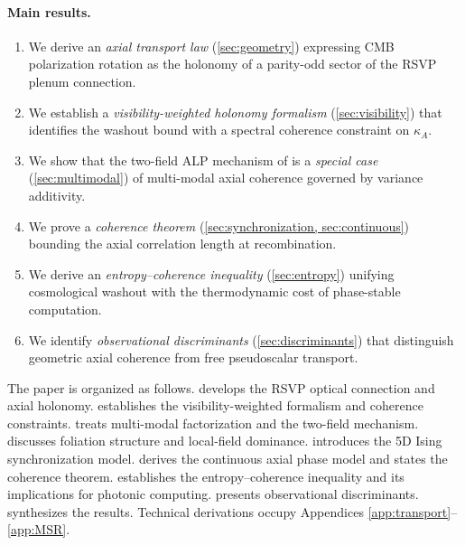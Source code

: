 \documentclass[12pt]{article}
\theoremstyle{definition}
\newcommand{\kA}{\kappa_A}
\begin{document}
\paragraph{Main results.}
\begin{enumerate}[leftmargin=1.8em,itemsep=2pt]
  \item We derive an \emph{axial transport law} (\cref{sec:geometry})
        expressing CMB polarization rotation as the holonomy of a
        parity-odd sector of the RSVP plenum connection.
  \item We establish a \emph{visibility-weighted holonomy formalism}
        (\cref{sec:visibility}) that identifies the washout bound with a
        spectral coherence constraint on $\kA$.
  \item We show that the two-field ALP mechanism of
        \cite{ShaoObataZhang2025} is a \emph{special case}
        (\cref{sec:multimodal}) of multi-modal axial coherence
        governed by variance additivity.
  \item We prove a \emph{coherence theorem} (\cref{sec:synchronization,
        sec:continuous}) bounding the axial correlation length at
        recombination.
  \item We derive an \emph{entropy--coherence inequality}
        (\cref{sec:entropy}) unifying cosmological washout with the
        thermodynamic cost of phase-stable computation.
  \item We identify \emph{observational discriminants}
        (\cref{sec:discriminants}) that distinguish geometric axial
        coherence from free pseudoscalar transport.
\end{enumerate}

\medskip
The paper is organized as follows.
 develops the RSVP optical connection and axial
holonomy.
 establishes the visibility-weighted formalism and
coherence constraints.
 treats multi-modal factorization and the two-field
mechanism.
 discusses foliation structure and local-field dominance.
 introduces the 5D Ising synchronization model.
 derives the continuous axial phase model and states
the coherence theorem.
 establishes the entropy--coherence inequality and its
implications for photonic computing.
 presents observational discriminants.
 synthesizes the results.
Technical derivations occupy Appendices \ref{app:transport}--\ref{app:MSR}.
\end{document}

